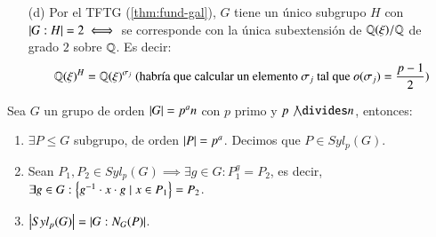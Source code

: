 \begin{ex}[H4.7]
\begin{itemize}
        \item[(d)]  Por el TFTG (\ref{thm:fund-gal}), $G$ tiene un único subgrupo $H$ con $\left|G:H\right| = 2 \iff $ se corresponde con la única subextensión de $\mathbb{Q}(\xi) / \mathbb{Q}$ de grado $2$ sobre $\mathbb{Q}$. Es decir:
        $$
            \mathbb{Q}(\xi)^H = \mathbb{Q}(\xi)^{\sigma_j} \text{ (habría que calcular un elemento $\sigma_j$ tal que $o(\sigma_j) = \frac{p-1}{2}$)}
        $$
    \end{itemize}
\end{ex}



\begin{pro}
    Sea $G$ un grupo de orden $\left|G\right| = p^a n$ con $p$ primo y $p \not \divides n$, entonces:
    \begin{enumerate}
        \item $\exists P \leq G$ subgrupo, de orden $\left|P\right| = p^a$. Decimos que $P \in Syl_p(G)$.
        \item Sean $P_1, P_2 \in Syl_p(G) \implies \exists g \in G: P_1^g = P_2$, es decir, $\exists g \in G: \left\{g^{-1} \cdot x \cdot g \mid x \in P_1\right\} = P_2$.
        \item $\left|Syl_p(G)\right| = \left|G:N_G(P)\right|$.
    \end{enumerate}
\end{pro}

